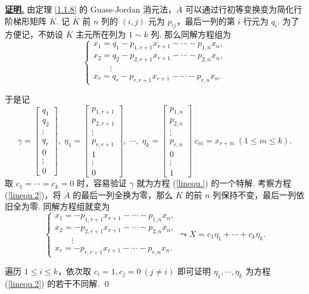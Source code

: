 \documentclass[10pt,openany]{article}
\theoremstyle{thmstyle} %
\theoremstyle{defstyle} %
\theoremstyle{prostyle} %
\theoremstyle{exastyle}
\theoremstyle{remstyle}
\renewenvironment{proof}[1][证明]{\par\underline{\textbf{#1.}} \;\fangsong}{\qed\par}
\begin{document}
\begin{proof}
	由定理 \ref{1.1.8} 的 Guass-Jordan 消元法，\( \overline{A} \) 可以通过行初等变换变为简化行阶梯形矩阵 \( \overline{K} \). 记 \( \overline{K} \) 前 \( n \) 列的 \( (i,j) \) 元为 \( p_{ij} \)，最后一列的第 \( i \) 行元为 \( q_i \). 为了方便记，不妨设 \( \overline{K} \) 主元所在列为 \( 1 \sim k \) 列. 那么同解方程组为
	\[ \left\{ \begin{array}{l}
		x_1= q_1-p_{1,r+1}x_{r+1}-\cdots-p_{1,n}x_n, \\
		x_2= q_2-p_{2,r+1}x_{r+1}-\cdots-p_{2,n}x_n, \\
		\qquad \vdots \\
		x_r= q_r-p_{r,r+1}x_{r+1}-\cdots-p_{r,n}x_n. 
	\end{array}\right. \]
	
	于是记
	\[ \gamma=\begin{bmatrix}
		q_1 \\ q_2 \\ \vdots \\ q_r \\ 0  \\ \vdots \\ 0
	\end{bmatrix},\; \eta_1=\begin{bmatrix}
	p_{1,r+1} \\ p_{2,r+1} \\ \vdots \\ p_{r,r+1} \\ 1 \\ \vdots \\ 0
	\end{bmatrix}, \; \cdots, \; \eta_k=\begin{bmatrix}
	p_{1,n} \\ p_{2,n} \\ \vdots \\ p_{r,n} \\ 0 \\ \vdots \\ 1
	\end{bmatrix}  \; c_{m}=x_{r+m} \ ( 1 \leq m \leq k). \]
	取 \( c_1=\cdots=c_k=0 \) 时，容易验证 \( \gamma \) 就为方程 (\ref{linequ.}) 的一个特解. 考察方程 (\ref{linequ.2})，将 \( \overline{A} \) 的最后一列全换为零，那么 \( \overline{K} \) 的前 \( n \) 列保持不变，最后一列依旧全为零. 同解方程组就变为
	\[ \left\{ \begin{array}{l}
		x_1= -p_{1,r+1}x_{r+1}-\cdots-p_{1,n}x_n, \\
		x_2= -p_{2,r+1}x_{r+1}-\cdots-p_{2,n}x_n, \\
		\qquad \vdots \\
		x_r= -p_{r,r+1}x_{r+1}-\cdots-p_{r,n}x_n. 
	\end{array}\right. \leadsto X=c_1\eta_1+\cdots+c_k\eta_k. \]
	
    遍历 \( 1 \leq i \leq k \)，依次取 \( c_i=1, c_j=0 \ (j \neq i) \) 即可证明 \( \eta_1,\cdots,\eta_k \) 为方程 (\ref{linequ.2}) 的若干不同解.
\end{proof}
\end{document}

